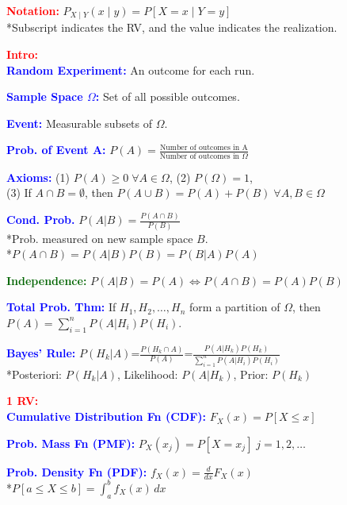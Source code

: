 \documentclass[5pt]{extarticle} %
\begin{document}
\begin{paracol}{3}
    {\tiny
    \textcolor{red}{\textbf{Notation:}} $P_{X \mid Y} (x \mid y) = P[X=x \mid Y=y]$ \\
    *Subscript indicates the RV, and the value indicates the realization.  

    \textcolor{red}{\textbf{Intro:}} \\
    \textcolor{blue}{\textbf{Random Experiment:}} An outcome for each run.  

    \textcolor{blue}{\textbf{Sample Space $\Omega$:}} Set of all possible outcomes.

    \textcolor{blue}{\textbf{Event:}} Measurable subsets of $\Omega$.

    \textcolor{blue}{\textbf{Prob. of Event A:}} $P(A) = \frac{\text{Number of outcomes in A}}{\text{Number of outcomes in } \Omega}$

    \textcolor{blue}{\textbf{Axioms:}} (1) $P(A) \geq 0 \; \forall A \in \Omega$, (2) $P(\Omega) = 1$, \\
    (3) If $A \cap B = \emptyset$, then $P(A \cup B) = P(A) + P(B) \; \forall A, B \in \Omega$

    \textcolor{blue}{\textbf{Cond. Prob.}} $P(A|B) = \frac{P(A \cap B)}{P(B)}$ \\
    *Prob. measured on new sample space $B$. \\ 
    *$P(A \cap B) = P(A|B) P(B) = P(B|A) P(A)$

    \textcolor{darkgreen}{\textbf{Independence:}} $P(A|B) = P(A) \Leftrightarrow P(A \cap B) = P(A) P(B)$

    \textcolor{blue}{\textbf{Total Prob. Thm:}} If $H_1, H_2, \ldots, H_n$ form a partition of $\Omega$, then $P(A) = \sum_{i=1}^n P(A|H_i) P(H_i)$.

    \textcolor{blue}{\textbf{Bayes' Rule:}} $P(H_k|A) \text{=} \frac{P(H_k \cap A)}{P(A)} \text{=} \frac{P(A|H_k) P(H_k)}{\sum_{i=1}^n P(A|H_i) P(H_i)}$ \\
    *Posteriori: $P(H_k|A)$, Likelihood: $P(A|H_k)$, Prior: $P(H_k)$ 

    \textcolor{red}{\textbf{1 RV:}} \\
    \textcolor{blue}{\textbf{Cumulative Distribution Fn (CDF):}} $F_X(x) = P[X \leq x]$ 

    \textcolor{blue}{\textbf{Prob. Mass Fn (PMF):}} $P_X(x_j) = P[X = x_j] \; j=1,2,\ldots$

    \textcolor{blue}{\textbf{Prob. Density Fn (PDF):}} $f_X(x) = \frac{d}{dx} F_X(x)$ \\
    *$P[a \leq X \leq b] = \int_a^b f_X(x) \, dx$ 

}
\end{paracol}
\end{document}
